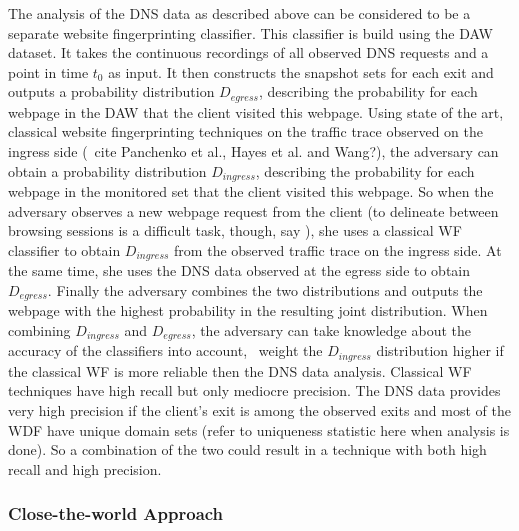 The analysis of the DNS data as described above can be considered to be
a separate website fingerprinting classifier. This classifier is build
using the DAW dataset. It takes the continuous recordings of all
observed DNS requests and a point in time $t_0$ as input. It then
constructs the snapshot sets for each exit and outputs a probability
distribution $D_{egress}$, describing the probability for each webpage
in the DAW that the client visited this webpage.
%
Using state of the art, classical website fingerprinting techniques on
the traffic trace observed on the ingress side (\eg~cite Panchenko et al.,
Hayes et al. and Wang?), the adversary can obtain a probability distribution
$D_{ingress}$, describing the probability for each webpage in the
monitored set that the client visited this webpage.
%
So when the adversary observes a new webpage request from the client
(to delineate between browsing sessions is a difficult task, though, say
\cite{Coull2007a}), she uses a classical WF classifier to obtain $D_{ingress}$
from the observed traffic trace on the ingress side. At the same time,
she uses the DNS data observed at the egress side to obtain $D_{egress}$.
Finally the adversary combines the two distributions and outputs the
webpage with the highest probability in the resulting joint distribution.
%
When combining $D_{ingress}$ and $D_{egress}$, the adversary can take
knowledge about the accuracy of the classifiers into account, \eg~weight
the $D_{ingress}$ distribution higher if the classical WF is more reliable
then the DNS data analysis.
%
Classical WF techniques have high recall but only mediocre precision.
The DNS data provides very high precision if the client's exit is among
the observed exits and most of the WDF have unique domain sets (refer to
uniqueness statistic here when analysis is done). So a combination of
the two could result in a technique with both high recall and high
precision.


\subsubsection{Close-the-world Approach}

